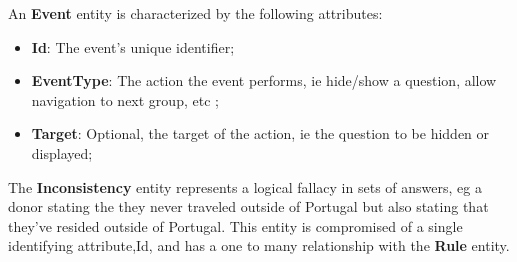 An \textbf{Event} entity is characterized by the following attributes:
\begin{itemize}
	\item \textbf{Id}: The event's unique identifier;
	\item \textbf{EventType}: The action the event performs, ie hide/show a question, allow navigation to next group, etc ;
	\item \textbf{Target}: Optional, the target of the action, ie the question to be hidden or displayed;
\end{itemize}

The \textbf{Inconsistency} entity represents a logical fallacy in sets of answers, eg a donor stating the they never traveled outside of Portugal but also stating that they've resided outside of Portugal.
This entity is compromised of a single identifying attribute,Id, and has a one to many relationship with the \textbf{Rule} entity. 


%
%








